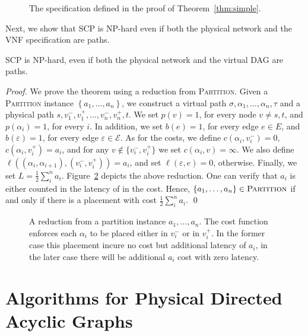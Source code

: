 \documentclass[runningheads]{llncs}
\newcommand{\set}[1]{\left\{ #1 \right\}}
\newcommand{\half}{\frac{1}{2}}
\newcommand{\eps}{\varepsilon}
\newcommand{\scp}{\textsc{SCP}\xspace}
\newcommand{\calE}{\mathcal{E}}
\begin{document}
\begin{figure}[t]
  \centering
\scalebox{1}{
  
}
\caption{The specification defined in the proof of Theorem~\ref{thm:simple}.}
\label{fig:simple}
\end{figure}

Next, we show that \scp is NP-hard even if both the physical network
and the VNF specification are paths.

\begin{theorem}
\scp is NP-hard, even if both the physical network and the virtual DAG
are paths.
\end{theorem}
\begin{proof}
We prove the theorem using a reduction from \textsc{Partition}.  Given
a \textsc{Partition} instance $\set{a_1, \ldots, a_n}$, we construct a
virtual path $\sigma, \alpha_1, \ldots, \alpha_n, \tau$ and a physical
path $s, v_1^-, v_1^+, \ldots, v_n^-, v_n^+, t$.  We set $p(v) = 1$,
for every node $v \neq s,t$, and $p(\alpha_i) = 1$, for every $i$.  In
addition, we set $b(e) = 1$, for every edge $e \in E$, and $b(\eps) =
1$, for every edge $\eps \in \calE$.
%
As for the costs, we define $c(\alpha_i, v_i^-) = 0$, $c(\alpha_i,
v_i^+) = a_i$, and for any $v \notin \{v_i^-,v_i^+\}$ we set
$c(\alpha_i, v) = \infty$.  We also define $\ell((\alpha_i,\alpha_{i+1}),
(v_i^-,v_i^+)) = a_i$, and set $\ell(\eps,e) = 0$, otherwise.  Finally,
we set $L = \half \sum_i^n a_i$.
%
Figure~\ref{fig:reduction2} depicts the above reduction.
%
One can verify that $a_i$ is either counted in the latency of in the
cost.  Hence, $\set{a_1, \ldots, a_n} \in \textsc{Partition}$ if and
only if there is a placement with cost $\half \sum_i^n a_i$.
%
\qed
\end{proof}


\begin{figure}[t]
\centering
\scalebox{.75}{

}
\caption{A reduction from a partition instance $a_1, \ldots, a_n$.
  The cost function enforces each $\alpha_i$ to be placed either in
  $v_i^-$ or in $v_i^+$.  In the former case this placement incure no
  cost but additional latency of $a_i$, in the later case there will
  be additional $a_i$ cost with zero latency.}
\label{fig:reduction2}
\end{figure}



\section{Algorithms for Physical Directed Acyclic Graphs}
\label{sec:algorithms}
\end{document}
